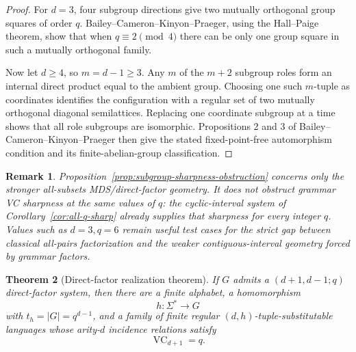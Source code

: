 \documentclass[11pt]{article}
\newtheorem{theorem}{Theorem}[section]
\newtheorem{remark}[theorem]{Remark}
\newcommand{\VC}{\operatorname{VC}}
\begin{document}
\begin{proof}
For \(d=3\), four subgroup directions give two mutually orthogonal group
squares of order \(q\).  Bailey--Cameron--Kinyon--Praeger, using the
Hall--Paige theorem, show that when \(q\equiv2\pmod4\) there can be only one
group square in such a mutually orthogonal family.

Now let \(d\ge4\), so \(m=d-1\ge3\).  Any \(m\) of the \(m+2\) subgroup
roles form an internal direct product equal to the ambient group.  Choosing
one such \(m\)-tuple as coordinates identifies the configuration with a
regular set of two mutually orthogonal diagonal semilattices.  Replacing one
coordinate subgroup at a time shows that all role subgroups are isomorphic.
Propositions 2 and 3 of Bailey--Cameron--Kinyon--Praeger then give the stated
fixed-point-free automorphism condition and its finite-abelian-group
classification.
\end{proof}

\begin{remark}
Proposition~\ref{prop:subgroup-sharpness-obstruction} concerns only the
stronger all-subsets MDS/direct-factor geometry.  It does \emph{not} obstruct
grammar VC sharpness at the same values of \(q\): the cyclic-interval system
of Corollary~\ref{cor:all-q-sharp} already supplies that sharpness for every
integer \(q\).  Values such as \(d=3,q=6\) remain useful test cases for the
strict gap between classical all-pairs factorization and the weaker
contiguous-interval geometry forced by grammar factors.
\end{remark}

\begin{theorem}[Direct-factor realization theorem]
\label{thm:factor-realization}
If \(G\) admits a \((d+1,d-1;q)\) direct-factor system, then there are a
finite alphabet, a homomorphism
\[
 h:\Sigma^*\to G
\]
with \(t_h=|G|=q^{d-1}\), and a family of finite regular
\((d,h)\)-tuple-substitutable languages whose arity-\(d\) incidence relations
satisfy
\[
 \VC_{d+1}=q.
\]
\end{theorem}
\end{document}
